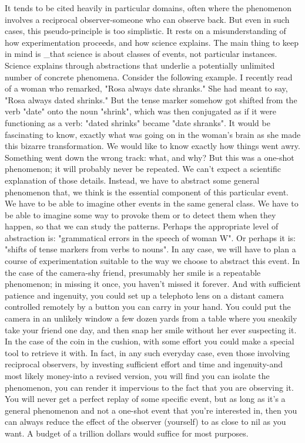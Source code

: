 It tends to be cited heavily in particular domains, often where the phenomenon
involves a reciprocal observer-someone who can observe back. But even in such
cases, this pseudo-principle is too simplistic. It rests on a misunderstanding of how
experimentation proceeds, and how science explains. The main thing to keep in mind
is \_that science is about classes of events, not particular instances. Science explains
through abstractions that underlie a potentially unlimited number of concrete
phenomena.
        Consider the following example. I recently read of a woman who remarked,
"Rosa always date shranks." She had meant to say, "Rosa always dated shrinks." But
the tense marker somehow got shifted from the verb "date" onto the noun "shrink",
which was then conjugated as if it were functioning as a verb: "dated shrinks" became
"date shranks". It would be fascinating to know, exactly what was going on in the
woman's brain as she made this bizarre transformation. We would like to know
exactly how things went awry. Something went down the wrong track: what, and
why?
        But this was a one-shot phenomenon; it will probably never be repeated. We
can't expect a scientific explanation of those details. Instead, we have to abstract some
general phenomenon that, we think is the essential component of this particular event.
We have to be able to imagine other events in the same general class. We have to be
able to imagine some way to provoke them or to detect them when they happen, so
that we can study the patterns. Perhaps the appropriate level of abstraction is:
"grammatical errors in the speech of woman W". Or perhaps it is: "shifts of tense
markers from verbs to nouns". In any case, we will have to plan a course of
experimentation suitable to the way we choose to abstract this event.
        In the case of the camera-shy friend, presumably her smile is a repeatable
phenomenon; in missing it once, you haven't missed it forever. And with sufficient
patience and ingenuity, you could set up a telephoto lens on a distant camera
controlled remotely by a button you can carry in your hand. You could put the camera
in an unlikely window a few dozen yards from a table where you sneakily take your
friend one day, and then snap her smile without her ever suspecting it.
        In the case of the coin in the cushion, with some effort you could make a
special tool to retrieve it with. In fact, in any such everyday case, even those involving
reciprocal observers, by investing sufficient effort and time and ingenuity-and most
likely money-into a revised version, you will find you can isolate the phenomenon,
you can render it impervious to the fact that you are observing it. You will never get a
perfect replay of some specific event, but as long as it's a general phenomenon and
not a one-shot event that you're interested in, then you can always reduce the effect of
the observer (yourself) to as close to nil as you want. A budget of a trillion dollars
would suffice for most purposes.




